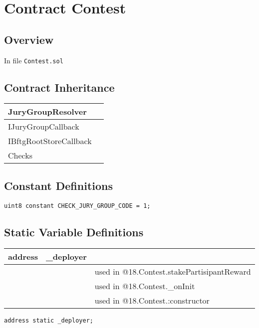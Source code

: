 
\chapter{Contract Contest}

\minitoc

\section{Overview}


In file {\tt Contest.sol}

\section{Contract Inheritance}


\noindent\begin{tabular}{|l|p{5cm}|}\hline
JuryGroupResolver & \\\hline
IJuryGroupCallback & \\\hline
IBftgRootStoreCallback & \\\hline
Checks & \\\hline
\end{tabular}


\section{Constant Definitions}


\begin{lstlisting}[firstnumber=15]
    uint8 constant CHECK_JURY_GROUP_CODE = 1;
\end{lstlisting}

\section{Static Variable Definitions}


\ifsoltables
\noindent\begin{tabular}{|l|l|p{5cm}|}\hline
address & \_{}deployer &  \\\hline
 & & used in @18.Contest.stakePartisipantReward\\\hline
 & & used in @18.Contest.\_{}onInit\\\hline
 & & used in @18.Contest.:constructor\\\hline
\end{tabular}
\fi


\begin{lstlisting}[firstnumber=28]
    address static _deployer;
\end{lstlisting}


